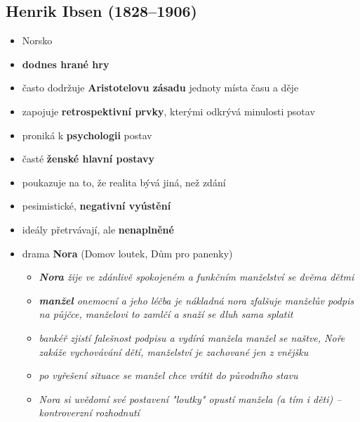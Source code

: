 \subsection{Henrik Ibsen (1828--1906)}
\begin{itemize}
\item Norsko
\item \textbf{dodnes hrané hry}
\item často dodržuje \textbf{Aristotelovu zásadu} jednoty místa času a děje
\item zapojuje \textbf{retrospektivní prvky}, kterými odkrývá minulosti psotav
\item proniká k \textbf{psychologii} postav
\item časté \textbf{ženské hlavní postavy}
\item poukazuje na to, že realita bývá jiná, než zdání
\item pesimistické, \textbf{negativní vyústění}
\item ideály přetrvávají, ale \textbf{nenaplněné}
\item drama \textbf{Nora} (Domov loutek, Dům pro panenky)
	\begin{itemize}
	\item \textit{\textbf{Nora} žije ve zdánlivě spokojeném a funkčním manželství se dvěma dětmi}
	\item \textit{\textbf{manžel} onemocní a jeho léčba je nákladná \ra nora zfalšuje manželův podpis na půjčce, manželovi to zamlčí a snaží se dluh sama splatit}
	\item \textit{bankéř zjistí falešnost podpisu a vydírá manžela \ra manžel se naštve, Noře zakáže vychovávání dětí, manželství je zachované jen z vnějšku}
	\item \textit{po vyřešení situace se manžel chce vrátit do původního stavu}
	\item \textit{Nora si uvědomí své postavení "loutky" \ra opustí manžela (a tím i děti) -- kontroverzní rozhodnutí}
	\end{itemize}


\end{itemize}
